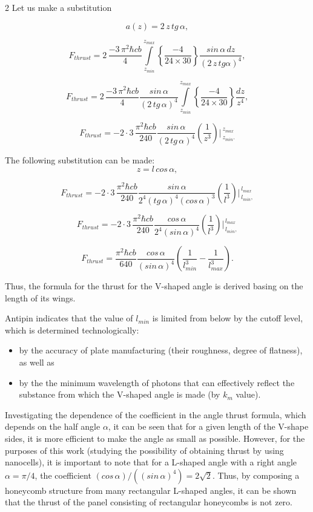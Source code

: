 \documentclass[twoside, 10pt]{article}
\begin{document}
\begin{multicols}{2}
Let us make a substitution

\[a\left(z\right) = 2\,z\,tg\, \alpha,\]

\[F_{thrust} = 2\, \frac{-3\,\pi^2\hbar c b}{4}\int\limits_{z_{min}}^{z_{max}} \left\{\frac{-4}{24\times30}\right\}\frac{sin\, \alpha\,dz}{\left(2\,z\,tg \alpha\right)^4},\]

\[F_{thrust} = 2\, \frac{-3\,\pi^2\hbar c b}{4} \frac{sin\, \alpha}{\left(2\,tg\, \alpha\right)^4} \int\limits_{z_{min}}^{z_{max}} \left\{\frac{-4}{24\times30}\right\} \frac{dz}{z^4},\]

\[F_{thrust} = -2\cdot3\, \frac{\pi^2\hbar c b}{240} \frac{sin\, \alpha}{\left(2\,tg\, \alpha\right)^4} \left(\frac{1}{z^3}\right)\Bigg\rvert_{\,z_{min}.}^{\,z_{max}} \]

    The following substitution can be made: \[z = l\, cos\, \alpha,\]

\[F_{thrust} = -2\cdot3\, \frac{\pi^2\hbar c b}{240} \frac{sin\, \alpha}{2^4\left(tg\,\alpha\right)^4\left(cos\, \alpha\right)^3} \left(\frac{1}{l^3}\right)\Bigg\rvert_{\,l_{min},}^{\,l_{max}} \]

\[F_{thrust} = -2\cdot3\, \frac{\pi^2\hbar c b}{240} \frac{cos\, \alpha}{2^4\left(sin\, \alpha\right)^4} \left(\frac{1}{l^3}\right)\Bigg\rvert_{\,l_{min},}^{\,l_{max}} \]

\noindent
\begin{equation}F_{thrust} = \frac{\pi^2\hbar c b}{640} \frac{cos\, \alpha}{\left(sin\, \alpha\right)^4} \left(\frac{1}{l_{min}^3} - \frac{1}{l_{max}^3}\right).\end{equation}

Thus, the formula for the thrust for the \mbox{V-shaped} angle is derived basing on the
length of its wings.

Antipin indicates that the value of \(l_{min}\) is limited from below by
the {\glqq}cutoff{\grqq} level, which is determined technologically:

\begin{itemize}
\item
  by the accuracy of plate manufacturing (their roughness,
  degree of flatness), as well as
\item
  by the the minimum wavelength of photons that can effectively reflect
  the substance from which the \mbox{V-shaped} angle is made (by \(k_m\) value).
\end{itemize}

    Investigating the dependence of the coefficient in the angle thrust
formula, which depends on the half angle \(\alpha\), it can be
seen that for a given length of the  \mbox{V-shape} sides, it is more efficient
to make the angle as small as possible. However, for the purposes of
this work (studying the possibility of obtaining thrust by using
nanocells), it is important to note that for a \mbox{L-shaped} angle with a right angle
\(\alpha = {\pi}/{4}\), the coefficient
\(\left({cos\, \alpha}\right)\big/\left({\left(sin\, \alpha\right)^4}\right) = 2\sqrt{2}\).
Thus, by composing a honeycomb structure from many
rectangular \mbox{L-shaped} angles, it can be shown that the thrust of the panel consisting
of rectangular honeycombs is not zero.


\end{multicols}
\end{document}
